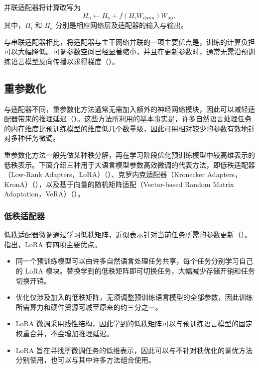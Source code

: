 并联适配器将计算改写为
\begin{equation}
H_o\gets H_o+f(H_iW_{\mathrm{down}})W_{\mathrm{up}},
\label{eq:ch04-parallel}
\end{equation}
其中，$H_i$ 和 $H_o$ 分别是相应网络层及适配器的输入与输出。

与串联适配器相比，将适配器与主干网络并联的一项主要优点是，训练的计算负担可以大幅降低。可调参数空间已经显著缩小，并且在更新参数时，通常无需沿预训练语言模型反向传播以求得梯度（）。


\subsection{重参数化}
\label{sec:ch04-reparameterization}
与适配器不同，重参数化方法通常无需加入额外的神经网络模块，因此可以减轻适配器带来的推理延迟（）。这些方法所利用的基本事实是，许多自然语言处理任务的内在维度比预训练模型的维度低几个数量级，因此可用相对较少的参数有效地针对多种任务微调。

重参数化方法一般先做某种秩分解，再在学习阶段优化预训练模型中较高维表示的低秩表示。下面介绍三种用于大语言模型参数高效微调的代表方法，即低秩适配器（Low-Rank Adapters，LoRA）（）、克罗内克适配器（Kronecker Adapters，KronA）（），以及基于向量的随机矩阵适配（Vector-based Random Matrix Adaptation，VeRA）（）。

\subsubsection{低秩适配器}
\label{sec:ch04-lora}
低秩适配器微调通过学习低秩矩阵，近似表示针对当前任务所需的参数更新（）。指出，LoRA 有四项主要优点。

\begin{itemize}
\item 同一个预训练模型可以由许多自然语言处理任务共享，每个任务分别学习自己的 LoRA 模块。替换学到的低秩矩阵即可切换任务，大幅减少存储开销和任务切换开销。
\item 优化仅涉及加入的低秩矩阵，无须调整预训练语言模型的全部参数，因此训练所需算力和硬件资源可减至原来的约三分之一。
\item LoRA 微调采用线性结构，因此学到的低秩矩阵可以与预训练语言模型的固定权重合并，不会增加推理延迟。
\item LoRA 旨在寻找所微调任务的低维表示，因此可以与不针对秩优化的调优方法分别使用，也可以与其中许多方法组合使用。
\end{itemize}

